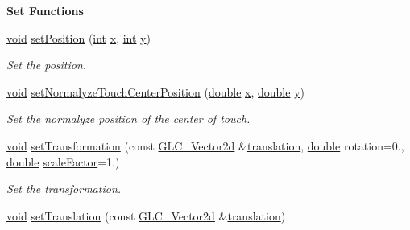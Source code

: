 \begin{Indent}{\bf Set Functions}\par
\begin{DoxyCompactItemize}
\item 
\hyperlink{group___u_a_v_objects_plugin_ga444cf2ff3f0ecbe028adce838d373f5c}{void} \hyperlink{class_g_l_c___user_input_a15acb98c7621dfc8bd0e4a8022593fae}{set\-Position} (\hyperlink{ioapi_8h_a787fa3cf048117ba7123753c1e74fcd6}{int} \hyperlink{glext_8h_a1db9d104e3c2128177f26aff7b46982f}{x}, \hyperlink{ioapi_8h_a787fa3cf048117ba7123753c1e74fcd6}{int} \hyperlink{glext_8h_a42315f3ed8fff752bb47fd782309fcfc}{y})
\begin{DoxyCompactList}\small\item\em Set the position. \end{DoxyCompactList}\item 
\hyperlink{group___u_a_v_objects_plugin_ga444cf2ff3f0ecbe028adce838d373f5c}{void} \hyperlink{class_g_l_c___user_input_ae879df11f92b69603c60a00833a154af}{set\-Normalyze\-Touch\-Center\-Position} (\hyperlink{_super_l_u_support_8h_a8956b2b9f49bf918deed98379d159ca7}{double} \hyperlink{glext_8h_a1db9d104e3c2128177f26aff7b46982f}{x}, \hyperlink{_super_l_u_support_8h_a8956b2b9f49bf918deed98379d159ca7}{double} \hyperlink{glext_8h_a42315f3ed8fff752bb47fd782309fcfc}{y})
\begin{DoxyCompactList}\small\item\em Set the normalyze position of the center of touch. \end{DoxyCompactList}\item 
\hyperlink{group___u_a_v_objects_plugin_ga444cf2ff3f0ecbe028adce838d373f5c}{void} \hyperlink{class_g_l_c___user_input_a1a833034c4d6b90bfc3d094f32dd8739}{set\-Transformation} (const \hyperlink{class_g_l_c___vector2d}{G\-L\-C\-\_\-\-Vector2d} \&\hyperlink{class_g_l_c___user_input_accb7009653b338ae2d85ad9067ee6eb0}{translation}, \hyperlink{_super_l_u_support_8h_a8956b2b9f49bf918deed98379d159ca7}{double} rotation=0., \hyperlink{_super_l_u_support_8h_a8956b2b9f49bf918deed98379d159ca7}{double} \hyperlink{class_g_l_c___user_input_ace6e13cdb480e56a22cf5de7a01150bf}{scale\-Factor}=1.)
\begin{DoxyCompactList}\small\item\em Set the transformation. \end{DoxyCompactList}\item 
\hyperlink{group___u_a_v_objects_plugin_ga444cf2ff3f0ecbe028adce838d373f5c}{void} \hyperlink{class_g_l_c___user_input_ab71acc61e2008f1e06b54060ff59571d}{set\-Translation} (const \hyperlink{class_g_l_c___vector2d}{G\-L\-C\-\_\-\-Vector2d} \&\hyperlink{class_g_l_c___user_input_accb7009653b338ae2d85ad9067ee6eb0}{translation})

\end{DoxyCompactItemize}
\end{Indent}
